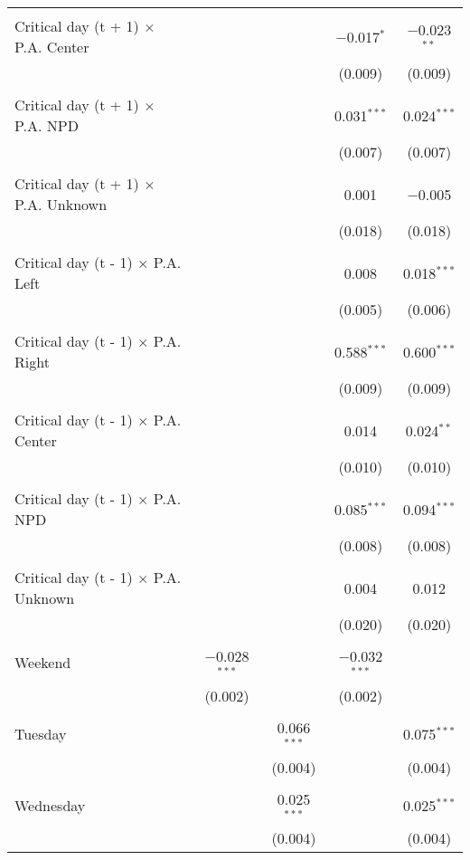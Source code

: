 \documentclass[
]{article}
\begin{document}
\begin{table}[!htbp]
{\begin{tabular}{@{\extracolsep{5pt}}lcccc}
  & & & & \\ 
 Critical day (t + 1) $\times$ P.A. Center &  &  & $-$0.017$^{*}$ & $-$0.023$^{**}$ \\ 
  &  &  & (0.009) & (0.009) \\ 
  & & & & \\ 
 Critical day (t + 1) $\times$ P.A. NPD &  &  & 0.031$^{***}$ & 0.024$^{***}$ \\ 
  &  &  & (0.007) & (0.007) \\ 
  & & & & \\ 
 Critical day (t + 1) $\times$ P.A. Unknown &  &  & 0.001 & $-$0.005 \\ 
  &  &  & (0.018) & (0.018) \\ 
  & & & & \\ 
 Critical day (t - 1) $\times$ P.A. Left &  &  & 0.008 & 0.018$^{***}$ \\ 
  &  &  & (0.005) & (0.006) \\ 
  & & & & \\ 
 Critical day (t - 1) $\times$ P.A. Right &  &  & 0.588$^{***}$ & 0.600$^{***}$ \\ 
  &  &  & (0.009) & (0.009) \\ 
  & & & & \\ 
 Critical day (t - 1) $\times$ P.A. Center &  &  & 0.014 & 0.024$^{**}$ \\ 
  &  &  & (0.010) & (0.010) \\ 
  & & & & \\ 
 Critical day (t - 1) $\times$ P.A. NPD &  &  & 0.085$^{***}$ & 0.094$^{***}$ \\ 
  &  &  & (0.008) & (0.008) \\ 
  & & & & \\ 
 Critical day (t - 1) $\times$ P.A. Unknown &  &  & 0.004 & 0.012 \\ 
  &  &  & (0.020) & (0.020) \\ 
  & & & & \\ 
 Weekend & $-$0.028$^{***}$ &  & $-$0.032$^{***}$ &  \\ 
  & (0.002) &  & (0.002) &  \\ 
  & & & & \\ 
 Tuesday &  & 0.066$^{***}$ &  & 0.075$^{***}$ \\ 
  &  & (0.004) &  & (0.004) \\ 
  & & & & \\ 
 Wednesday &  & 0.025$^{***}$ &  & 0.025$^{***}$ \\ 
  &  & (0.004) &  & (0.004) \\ 

\end{tabular}}
\end{table}
\end{document}

